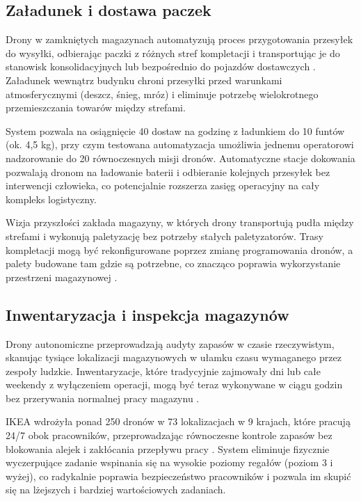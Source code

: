 \documentclass{EE-dyplom}
\begin{document}
\subsection{Załadunek i dostawa paczek}

Drony w zamkniętych magazynach automatyzują proces przygotowania przesyłek do wysyłki, odbierając paczki z różnych stref kompletacji i transportując je do stanowisk konsolidacyjnych lub bezpośrednio do pojazdów dostawczych \cite{cichosz2020}. Załadunek wewnątrz budynku chroni przesyłki przed warunkami atmosferycznymi (deszcz, śnieg, mróz) i eliminuje potrzebę wielokrotnego przemieszczania towarów między strefami.

System pozwala na osiągnięcie 40 dostaw na godzinę z ładunkiem do 10 funtów (ok. 4,5 kg), przy czym testowana automatyzacja umożliwia jednemu operatorowi nadzorowanie do 20 równoczesnych misji dronów. Automatyczne stacje dokowania pozwalają dronom na ładowanie baterii i odbieranie kolejnych przesyłek bez interwencji człowieka, co potencjalnie rozszerza zasięg operacyjny na cały kompleks logistyczny.

Wizja przyszłości zakłada magazyny, w których drony transportują pudła między strefami i wykonują paletyzację bez potrzeby stałych paletyzatorów. Trasy kompletacji mogą być rekonfigurowane poprzez zmianę programowania dronów, a palety budowane tam gdzie są potrzebne, co znacząco poprawia wykorzystanie przestrzeni magazynowej \cite{logisticsbureau2024}.

\subsection{Inwentaryzacja i inspekcja magazynów}

Drony autonomiczne przeprowadzają audyty zapasów w czasie rzeczywistym, skanując tysiące lokalizacji magazynowych w ułamku czasu wymaganego przez zespoły ludzkie. Inwentaryzacje, które tradycyjnie zajmowały dni lub całe weekendy z wyłączeniem operacji, mogą być teraz wykonywane w ciągu godzin bez przerywania normalnej pracy magazynu \cite{aeologic2025}.

IKEA wdrożyła ponad 250 dronów w 73 lokalizacjach w 9 krajach, które pracują 24/7 obok pracowników, przeprowadzając równoczesne kontrole zapasów bez blokowania alejek i zakłócania przepływu pracy \cite{talkinglogistics2024}. System eliminuje fizycznie wyczerpujące zadanie wspinania się na wysokie poziomy regałów (poziom 3 i wyżej), co radykalnie poprawia bezpieczeństwo pracowników i pozwala im skupić się na lżejszych i bardziej wartościowych zadaniach.
\end{document}
